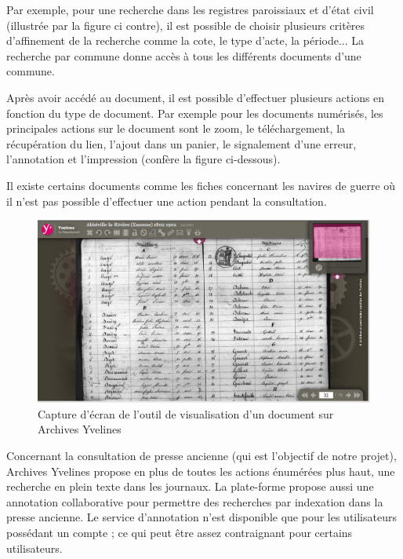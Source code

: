         Par exemple, pour une recherche dans les registres paroissiaux et d’état civil (illustrée par la figure ci contre),
        il est possible de choisir plusieurs critères d’affinement de la recherche comme la cote, le type d’acte, la période...
        La recherche par commune donne accès à tous les différents documents d’une commune.

        Après avoir accédé au document, il est possible d’effectuer plusieurs actions en fonction du type de document.
        Par exemple pour les documents numérisés, les principales actions sur le document sont le zoom, le téléchargement,
        la récupération du lien, l’ajout dans un panier, le signalement d’une erreur, l’annotation et l’impression (confère la figure ci-dessous).

        Il existe certains documents comme les fiches concernant les navires de guerre où il n’est pas possible d’effectuer
        une action pendant la consultation.

        \begin{figure}[H]
            \centering
            \includegraphics[width=1\textwidth]{figure/screen_yvelines_document.png}
            \caption{Capture d'écran de l'outil de visualisation d'un document sur Archives Yvelines}
            \label{fig:yvelines_doc}
        \end{figure}

        Concernant la consultation de presse ancienne (qui est l’objectif de notre projet), Archives Yvelines propose en plus
        de toutes les actions énumérées plus haut, une recherche en plein texte dans les journaux. La plate-forme propose
        aussi une annotation collaborative pour permettre des recherches par indexation dans la presse ancienne. Le service d’annotation
        n’est disponible que pour les utilisateurs possédant un compte ; ce qui peut être assez contraignant pour certains utilisateurs.

